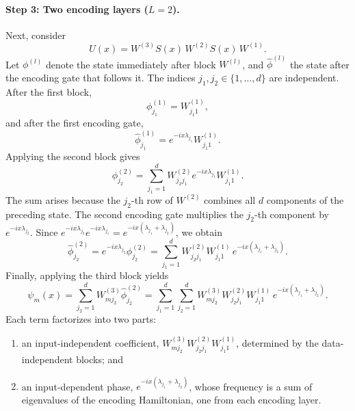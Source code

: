 \documentclass[12pt]{article}
\numberwithin{equation}{section}  %
\begin{document}
\paragraph{Step 3: Two encoding layers ($L=2$).} Next, consider
\begin{equation}
U(x) = W^{(3)} S(x)\, W^{(2)} S(x)\, W^{(1)}.
\end{equation}
Let $\phi^{(l)}$ denote the state immediately after block $W^{(l)}$, and $\hat{\phi}^{(l)}$ the state after the encoding gate that follows it. The indices $j_1, j_2 \in \{1, \ldots, d\}$ are independent. After the first block,
\begin{equation}
\phi^{(1)}_{j_1} = W^{(1)}_{j_1 1},
\end{equation}
and after the first encoding gate,
\begin{equation}
\hat{\phi}^{(1)}_{j_1} = e^{-ix\lambda_{j_1}} W^{(1)}_{j_1 1}.
\end{equation}
Applying the second block gives
\begin{equation}
\phi^{(2)}_{j_2} = \sum_{j_1=1}^{d} W^{(2)}_{j_2 j_1} e^{-ix\lambda_{j_1}} W^{(1)}_{j_1 1}.
\end{equation}
The sum arises because the $j_2$-th row of $W^{(2)}$ combines all $d$ components of the preceding state. The second encoding gate multiplies the $j_2$-th component by $e^{-ix\lambda_{j_2}}$. Since $e^{-ix\lambda_{j_2}} e^{-ix\lambda_{j_1}} = e^{-ix(\lambda_{j_1}+\lambda_{j_2})}$, we obtain
\begin{equation}
\hat{\phi}^{(2)}_{j_2} = e^{-ix\lambda_{j_2}}\phi^{(2)}_{j_2}
= \sum_{j_1=1}^{d} W^{(2)}_{j_2 j_1} W^{(1)}_{j_1 1}\, e^{-ix(\lambda_{j_1}+\lambda_{j_2})}.
\end{equation}
Finally, applying the third block yields
\begin{equation}
\psi_m(x) = \sum_{j_2=1}^{d} W^{(3)}_{m j_2} \hat{\phi}^{(2)}_{j_2}
= \sum_{j_1=1}^{d}\sum_{j_2=1}^{d} W^{(3)}_{m j_2} W^{(2)}_{j_2 j_1} W^{(1)}_{j_1 1}\, e^{-ix(\lambda_{j_1}+\lambda_{j_2})}.
\end{equation}
Each term factorizes into two parts:
\begin{enumerate}
\item an input-independent coefficient, $W^{(3)}_{m j_2} W^{(2)}_{j_2 j_1} W^{(1)}_{j_1 1}$, determined by the data-independent blocks; and
\item an input-dependent phase, $e^{-ix(\lambda_{j_1}+\lambda_{j_2})}$, whose frequency is a sum of eigenvalues of the encoding Hamiltonian, one from each encoding layer.
\end{enumerate}
\end{document}
